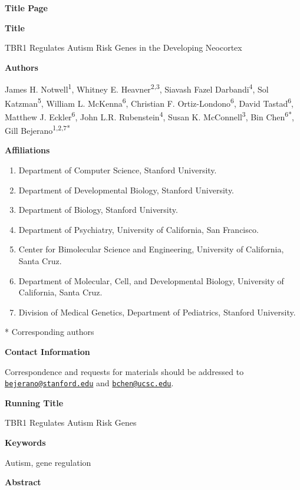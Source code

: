 \documentclass[]{article}
\date{}
\begin{document}
\textbf{Title Page}

\textbf{Title}

TBR1 Regulates Autism Risk Genes in the Developing Neocortex

\textbf{Authors}

James H. Notwell\textsuperscript{1}, Whitney E.
Heavner\textsuperscript{2,3}, Siavash Fazel Darbandi\textsuperscript{4},
Sol Katzman\textsuperscript{5}, William L. McKenna\textsuperscript{6},
Christian F. Ortiz-Londono\textsuperscript{6}, David
Tastad\textsuperscript{6}, Matthew J. Eckler\textsuperscript{6}, John
L.R. Rubenstein\textsuperscript{4}, Susan K.
McConnell\textsuperscript{3}, Bin Chen\textsuperscript{6*}, Gill
Bejerano\textsuperscript{1,2,7*}

\textbf{Affiliations}

\begin{enumerate}
\def\labelenumi{\arabic{enumi}.}
\item
  Department of Computer Science, Stanford University.
\item
  Department of Developmental Biology, Stanford University.
\item
  Department of Biology, Stanford University.
\item
  Department of Psychiatry, University of California, San Francisco.
\item
  Center for Bimolecular Science and Engineering, University of
  California, Santa Cruz.
\item
  Department of Molecular, Cell, and Developmental Biology, University
  of California, Santa Cruz.
\item
  Division of Medical Genetics, Department of Pediatrics, Stanford
  University.
\end{enumerate}

* Corresponding authors

\textbf{Contact Information}

Correspondence and requests for materials should be addressed to
\href{mailto:bejerano@stanford.edu}{\nolinkurl{bejerano@stanford.edu}}
and \href{mailto:bchen@ucsc.edu}{\nolinkurl{bchen@ucsc.edu}}.

\textbf{Running Title}

TBR1 Regulates Autism Risk Genes

\textbf{Keywords}

Autism, gene regulation

\textbf{Abstract}
\end{document}
